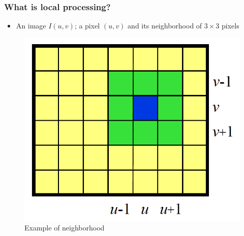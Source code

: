 \documentclass[english,11pt,table,handout]{beamer}
\begin{document}
\frame
{
	\frametitle{What is local processing?}
	\begin{example}
		\begin{itemize}
			\item An image $I(u,v)$; a pixel $(u,v)$ and its neighborhood of $3\times 3 $ pixels
		\end{itemize}
		\centering
		\begin{figure}[!h]
			\includegraphics[scale=0.5]{neighborhood.png}
			\caption{Example of neighborhood}
		\end{figure}
	\end{example}
	
}
\end{document}

